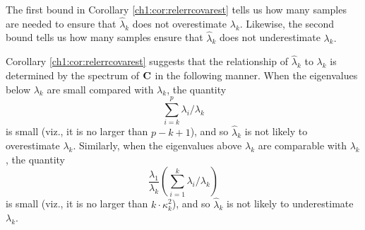 The first bound in Corollary \ref{ch1:cor:relerrcovarest} tells us how many samples
are needed to ensure that $\hat{\lambda}_k$ does not overestimate $\lambda_k.$
Likewise, the second bound tells us how many samples ensure that
$\hat{\lambda}_k$ does not underestimate $\lambda_k.$



Corollary \ref{ch1:cor:relerrcovarest} suggests that the relationship of
$\hat{\lambda}_k$ to $\lambda_k$ is determined by the spectrum of $\mathbf{C}$ in
the following manner. When the eigenvalues below $\lambda_k$ are small
compared with $\lambda_k$, the quantity
\[
 \sum_{i=k}^p \lambda_i/\lambda_k
\]
is small (viz., it is no larger than $p-k+1$), and so $\hat{\lambda}_k$ is not likely to overestimate $\lambda_k$.
Similarly, when the eigenvalues above $\lambda_k$ are comparable with
$\lambda_k$, the quantity
\[
\frac{\lambda_1}{\lambda_k}\left(\sum_{i=1}^k
\lambda_i/\lambda_k  \right)
\]
is small (viz., it is no larger than $k\cdot\kappa_k^2$), and so $\hat{\lambda}_k$ is not likely to underestimate $\lambda_k$.



